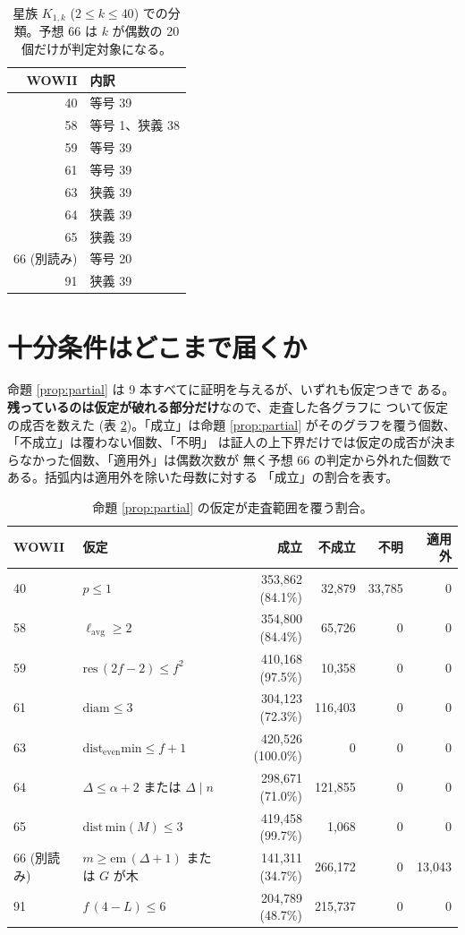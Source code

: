 \documentclass[paper=a4,fontsize=10.5pt,jafontsize=10.5pt]{jlreq}
\theoremstyle{plain}
\theoremstyle{definition}
\begin{document}
\begin{table}[htbp]
\centering
\caption{星族 $K_{1,k}$ ($2 \le k \le 40$) での分類。予想 66 は
$k$ が偶数の 20 個だけが判定対象になる。}
\label{tab:star}
\begin{tabular}{rl}
\toprule
WOWII & 内訳 \\
\midrule
40 & 等号 39 \\
58 & 等号 1、狭義 38 \\
59 & 等号 39 \\
61 & 等号 39 \\
63 & 狭義 39 \\
64 & 狭義 39 \\
65 & 狭義 39 \\
66 (別読み) & 等号 20 \\
91 & 狭義 39 \\
\bottomrule
\end{tabular}
\end{table}

\section{十分条件はどこまで届くか}\label{sec:coverage}

命題 \ref{prop:partial} は 9 本すべてに証明を与えるが、いずれも仮定つきで
ある。\textbf{残っているのは仮定が破れる部分だけ}なので、走査した各グラフに
ついて仮定の成否を数えた (表 \ref{tab:cover})。「成立」は命題
\ref{prop:partial} がそのグラフを覆う個数、「不成立」は覆わない個数、「不明」
は証人の上下界だけでは仮定の成否が決まらなかった個数、「適用外」は偶数次数が
無く予想 66 の判定から外れた個数である。括弧内は適用外を除いた母数に対する
「成立」の割合を表す。

\begin{table}[htbp]
\centering
\caption{命題 \ref{prop:partial} の仮定が走査範囲を覆う割合。}
\label{tab:cover}
\begin{tabular}{llrrrr}
\toprule
WOWII & 仮定 & 成立 & 不成立 & 不明 & 適用外 \\
\midrule
40 & $p \le 1$ & 353,862 (84.1\%) & 32,879 & 33,785 & 0 \\
58 & $\ell_{\mathrm{avg}} \ge 2$ & 354,800 (84.4\%) & 65,726 & 0 & 0 \\
59 & $\mathrm{res}\,(2f-2) \le f^2$ & 410,168 (97.5\%) & 10,358 & 0 & 0 \\
61 & $\mathrm{diam} \le 3$ & 304,123 (72.3\%) & 116,403 & 0 & 0 \\
63 & $\mathrm{dist_{even}min} \le f + 1$ & 420,526 (100.0\%) & 0 & 0 & 0 \\
64 & $\Delta \le \alpha + 2$ または $\Delta \mid n$ & 298,671 (71.0\%) & 121,855 & 0 & 0 \\
65 & $\mathrm{dist\,min}(M) \le 3$ & 419,458 (99.7\%) & 1,068 & 0 & 0 \\
66 (別読み) & $m \ge \mathrm{em}\,(\Delta + 1)$ または $G$ が木 & 141,311 (34.7\%) & 266,172 & 0 & 13,043 \\
91 & $f\,(4 - L) \le 6$ & 204,789 (48.7\%) & 215,737 & 0 & 0 \\
\bottomrule
\end{tabular}
\end{table}
\end{document}
